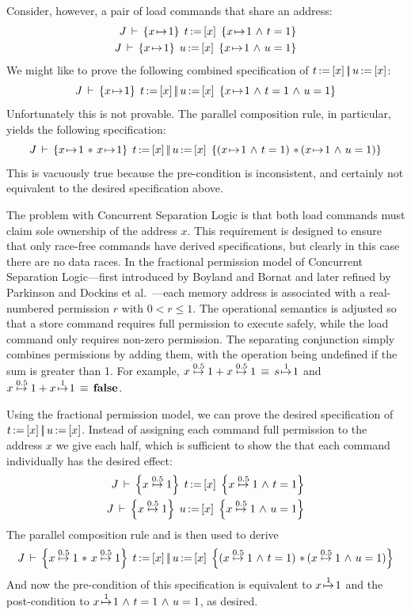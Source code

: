 \documentclass[11pt]{report}         %
\begin{document}
Consider, however, a pair of load commands that share an address: \begin{align*}
  \spec{J}{x \fpointsto 1}{\cload{t}{x}}{x \fpointsto 1 \conj t = 1} \\
  \spec{J}{x \fpointsto 1}{\cload{u}{x}}{x \fpointsto 1 \conj u = 1}
\end{align*}
We might like to prove the following combined specification of $t \operatorname{:\!=} \left[ x \right] \operatorname{|\!|} u \operatorname{:\!=} \left[ x \right]$: \[ J\,\vdash\,\left\lbrace x \!\mapsto\! 1 \right\rbrace\;t \operatorname{:\!=} \left[ x \right] \operatorname{|\!|} u \operatorname{:\!=} \left[ x \right]\;\left\lbrace x \!\mapsto\! 1 \operatorname{\,\wedge\,} t = 1 \operatorname{\,\wedge\,} u = 1 \right\rbrace \] Unfortunately this is not provable. The parallel composition rule, in particular, yields the following specification: \[ \spec{J}{x \fpointsto 1 \fsep x \fpointsto 1}{\cload{t}{x} \oppar \cload{u}{x}}{(x \fpointsto 1 \conj t = 1) \fsep (x \fpointsto 1 \conj u = 1)}\] This is vacuously true because the pre-condition is inconsistent, and certainly not equivalent to the desired specification above.

The problem with Concurrent Separation Logic is that both load commands must claim sole ownership of the address $x$. This requirement is designed to ensure that only race-free commands have derived specifications, but clearly in this case there are no data races. In the fractional permission model of Concurrent Separation Logic---first introduced by Boyland and Bornat \cite{DBLP:conf/sas/Boyland03,DBLP:conf/popl/BornatCOP05} and later refined by Parkinson and Dockins et al.~\cite{ParkinsonDissertation,DBLP:conf/aplas/DockinsHA09}---each memory address is associated with a real-numbered permission $r$ with $0 < r \leq 1$. The operational semantics is adjusted so that a store command requires full permission to execute safely, while the load command only requires non-zero permission. The separating conjunction simply combines permissions by adding them, with the operation being undefined if the sum is greater than 1. For example, $x \stackrel{0.5}{\!\mapsto\!} 1 + x \stackrel{0.5}{\!\mapsto\!} 1 \,\equiv\, s \stackrel{1}{\!\mapsto\!} 1$ and $x \stackrel{0.5}{\!\mapsto\!} 1 + x \stackrel{1}{\!\mapsto\!} 1 \,\equiv\, \mathbf{false}$.

Using the fractional permission model, we can prove the desired specification of $t \operatorname{:\!=} \left[ x \right] \operatorname{|\!|} u \operatorname{:\!=} \left[ x \right]$. Instead of assigning each command full permission to the address $x$ we give each half, which is sufficient to show the that each command individually has the desired effect: \begin{align*}
  \spec{J}{x \stackrel{0.5}{\fpointsto} 1}{\cload{t}{x}}{x \stackrel{0.5}{\fpointsto} 1 \conj t = 1} \\
  \spec{J}{x \stackrel{0.5}{\fpointsto} 1}{\cload{u}{x}}{x \stackrel{0.5}{\fpointsto} 1 \conj u = 1}  
\end{align*} The parallel composition rule and is then used to derive \[ \spec{J}{x \stackrel{0.5}{\fpointsto} 1 \fsep x \stackrel{0.5}{\fpointsto} 1}{\cload{t}{x}\oppar \cload{u}{x}}{(x \stackrel{0.5}{\fpointsto} 1 \conj t = 1) \fsep (x \stackrel{0.5}{\fpointsto} 1 \conj u = 1)}\] And now the pre-condition of this specification is equivalent to $x \stackrel{1}{\!\mapsto\!} 1$ and the post-condition to $x \stackrel{1}{\!\mapsto\!} 1 \operatorname{\,\wedge\,} t = 1 \operatorname{\,\wedge\,} u = 1$, as desired. 
\end{document}
